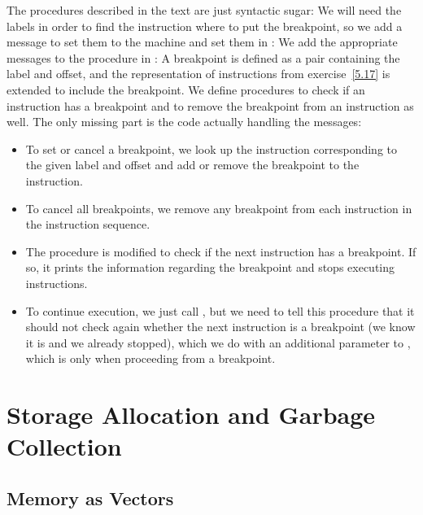 \begin{exe}[5.19]
    The procedures described in the text are just syntactic sugar:
    We will need the labels in order to find the instruction where to put the 
    breakpoint, so we add a message to set them to the machine and set them in 
    :
    We add the appropriate messages to the  procedure in 
    :
    A breakpoint is defined as a pair containing the label and offset, and the 
    representation of instructions from exercise~\ref{5.17} is extended to 
    include the breakpoint. We define procedures to check if an instruction has 
    a breakpoint and to remove the breakpoint from an instruction as well.
    The only missing part is the code actually handling the messages:
    \begin{itemize}
	\item To set or cancel a breakpoint, we look up the instruction 
	    corresponding to the given label and offset and add or remove the 
	    breakpoint to the instruction.
	\item To cancel all breakpoints, we remove any breakpoint from each 
	    instruction in the instruction sequence.
	\item The  procedure is modified to check if the next 
	    instruction has a breakpoint. If so, it prints the information 
	    regarding the breakpoint and stops executing instructions.
	\item To continue execution, we just call , but we need to 
	    tell this procedure that it should not check again whether the next 
	    instruction is a breakpoint (we know it is and we already stopped), 
	    which we do with an additional parameter to , which is 
	     only when proceeding from a breakpoint.
    \end{itemize}
\end{exe}

\section{Storage Allocation and Garbage Collection}

\subsection{Memory as Vectors}

